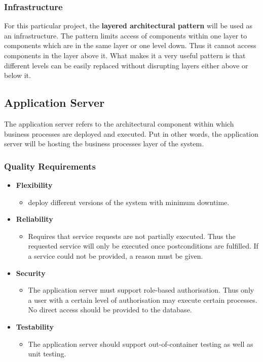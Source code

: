 \documentclass[a4paper,12pt]{article}
\begin{document}
	\subsubsection{Infrastructure}
	For this particular project, the \textbf{layered architectural pattern} will be used as an infrastructure. The pattern limits access of components within one layer to components which are in the same layer or one level down. Thus it cannot access components in the layer above it. What makes it a very useful pattern is that different levels can be easily replaced without disrupting layers either above or below it. 
	
	\newpage
	\subsection{Application Server}
	The application server refers to the architectural component within which business processes are deployed and executed. Put in other words, the application server will be hosting the business processes layer of the system.
	
	\subsubsection{Quality Requirements}
	\begin{itemize}
		\item\textbf{Flexibility}
		\begin{itemize}
			\item deploy different versions of the system with minimum downtime.
		\end{itemize}
		
		\item\textbf{Reliability}
		\begin{itemize}
			\item Requires that service requests are not partially executed. Thus the requested service will only be executed once postconditions are fulfilled. If a service could not be provided, a reason must be given.
		\end{itemize}
		
		\item\textbf{Security}
		\begin{itemize}
			\item The application server must support role-based authorisation. Thus only a user with a certain level of authorisation may execute certain processes. No direct access should be provided to the database. 
		\end{itemize}
		
		\item\textbf{Testability}
		\begin{itemize}
			\item The application server should support out-of-container testing as well as unit testing.
		\end{itemize}
		
	\end{itemize}
	
\end{document}
